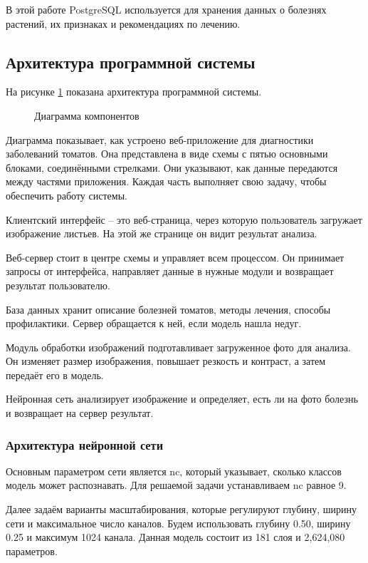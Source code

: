 В этой работе PostgreSQL используется для хранения данных о болезнях растений, их признаках и рекомендациях по лечению.

\subsection{Архитектура программной системы}

На рисунке \ref{comp:image} показана архитектура программной системы.
 
 \begin{figure}[ht]
 	\caption{Диаграмма компонентов}
 	\label{comp:image}
 \end{figure}
 
 Диаграмма показывает, как устроено веб-приложение для диагностики заболеваний томатов. Она представлена в виде схемы с пятью основными блоками, соединёнными стрелками. Они указывают, как данные передаются между частями приложения. Каждая часть выполняет свою задачу, чтобы обеспечить работу системы.
 
 Клиентский интерфейс -- это веб-страница, через которую пользователь загружает изображение листьев. На этой же странице он видит результат анализа.%
 
 Веб-сервер стоит в центре схемы и управляет всем процессом. Он принимает запросы от интерфейса, направляет данные в нужные модули и возвращает результат пользователю. 
 
 База данных хранит описание болезней томатов, методы лечения, способы профилактики. Сервер обращается к ней, если модель нашла недуг.
 
 Модуль обработки изображений подготавливает загруженное фото для анализа. Он изменяет размер изображения, повышает резкость и контраст, а затем передаёт его в модель. 
 
 Нейронная сеть анализирует изображение и определяет, есть ли на фото болезнь и возвращает на сервер результат.

\subsubsection{Архитектура нейронной сети}
Основным параметром сети является nc, который указывает, сколько классов модель может распознавать. Для решаемой задачи устанавливаем nc равное 9. 

Далее задаём варианты масштабирования, которые регулируют глубину, ширину сети и максимальное число каналов. Будем использовать глубину 0.50, ширину 0.25 и максимум 1024 канала. Данная модель состоит из 181 слоя и 2,624,080 параметров.

